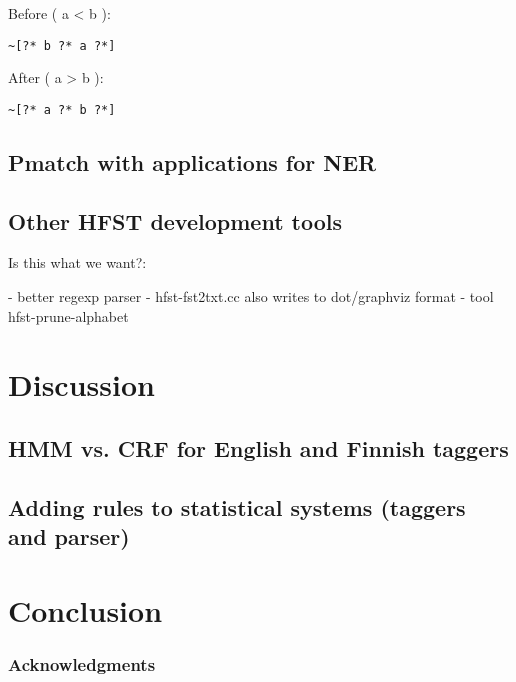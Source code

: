 \documentclass{llncs}
\begin{document}
Before ( a < b ):

\begin{verbatim}
~[?* b ?* a ?*]
\end{verbatim}

After ( a > b ):

\begin{verbatim}
~[?* a ?* b ?*]
\end{verbatim}

\subsection{Pmatch with applications for NER}

\subsection{Other HFST development tools}

Is this what we want?:

- better regexp parser
- hfst-fst2txt.cc also writes to dot/graphviz format
- tool hfst-prune-alphabet

\section{Discussion}\label{hfst:discussion}

\subsection{HMM vs. CRF for English and Finnish taggers}

\subsection{Adding rules to statistical systems (taggers and parser)}

\section{Conclusion}\label{hfst:conclusion}

\subsubsection*{Acknowledgments}



\end{document}
